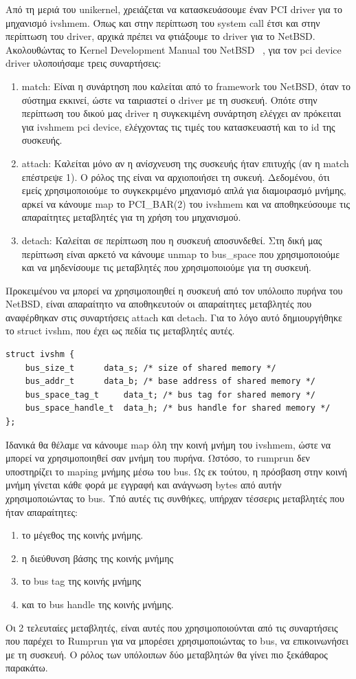 Από τη μεριά του unikernel, χρειάζεται να κατασκευάσουμε έναν PCI driver για το
μηχανισμό ivshmem. Όπως και στην περίπτωση του system call έτσι και στην
περίπτωση του driver, αρχικά πρέπει να φτιάξουμε το driver για το NetBSD. 
Ακολουθώντας το Kernel Development Manual του NetBSD ~\cite{NetBSDKDMDriver},
για τον pci device driver υλοποιήσαμε τρεις συναρτήσεις:
\begin{enumerate}
	\item match: Είναι η συνάρτηση που καλείται από το 
		framework του NetBSD, όταν το σύστημα εκκινεί, ώστε να
		ταιριαστεί ο driver με τη συσκευή. Οπότε στην περίπτωση του
		δικού μας driver η συγκεκιμένη συνάρτηση ελέγχει αν πρόκειται
		για ivshmem pci device, ελέγχοντας τις τιμές του κατασκευαστή
		και το id της συσκευής.
	\item attach: Καλείται μόνο αν η ανίσχνευση της συσκευής ήταν επιτυχής
		(αν η match επέστρεψε 1). Ο ρόλος της είναι να αρχιοποιήσει τη
		συκευή. Δεδομένου, ότι εμείς χρησιμοποιούμε το συγκεκριμένο
		μηχανισμό απλά για διαμοιρασμό μνήμης, αρκεί να κάνουμε map το
		PCI\_BAR(2) του ivshmem και να αποθηκεύσουμε τις απαραίτητες
		μεταβλητές για τη χρήση του μηχανισμού.
	\item detach: Καλείται σε περίπτωση που η συσκευή αποσυνδεθεί. Στη δική
		μας περίπτωση είναι αρκετό να κάνουμε unmap το bus\_space που
		χρησιμοποιούμε και να μηδενίσουμε τις μεταβλητές που
		χρησιμοποιούμε για τη συσκευή.
\end{enumerate}

Προκειμένου να μπορεί να χρησιμοποιηθεί η συσκευή από τον υπόλοιπο πυρήνα του
NetBSD, είναι απαραίτητο να αποθηκευτούν οι απαραίτητες μεταβλητές που
αναφέρθηκαν στις συναρτήσεις attach και detach. Για το λόγο αυτό δημιουργήθηκε
το struct ivshm, που έχει ως πεδία τις μεταβλητές αυτές. 
\newpage
\begin{lstlisting}[numbers=none]
struct ivshm {
	bus_size_t		data_s;	/* size of shared memory */
	bus_addr_t		data_b;	/* base address of shared memory */
	bus_space_tag_t		data_t;	/* bus tag for shared memory */
	bus_space_handle_t	data_h;	/* bus handle for shared memory */
};
\end{lstlisting}
Ιδανικά θα θέλαμε να κάνουμε map όλη την κοινή μνήμη του ivshmem, ώστε να μπορεί
να χρησιμοποιηθεί σαν μνήμη του πυρήνα. Ωστόσο, το rumprun δεν υποστηρίζει το
maping μνήμης μέσω του bus. Ως εκ τούτου, η πρόσβαση στην κοινή μνήμη γίνεται
κάθε φορά με εγγραφή και ανάγνωση bytes από αυτήν χρησιμοποιώντας το bus. Υπό
αυτές τις συνθήκες, υπήρχαν τέσσερις μεταβλητές που ήταν απαραίτητες:
\begin{enumerate}
	\item το μέγεθος της κοινής μνήμης.
	\item η διεύθυνση βάσης της κοινής μνήμης
	\item το bus tag της κοινής μνήμης
	\item και το bus handle της κοινής μνήμης.
\end{enumerate}
Οι 2 τελευταίες μεταβλητές, είναι αυτές που χρησιμοποιούνται από τις συναρτήσεις
που παρέχει το Rumprun για να μπορέσει χρησιμοποιώντας το bus, να επικοινωνήσει
με τη συσκευή. Ο ρόλος των υπόλοιπων δύο μεταβλητών θα γίνει πιο ξεκάθαρος
παρακάτω.

